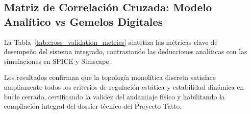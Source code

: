 \subsection{Matriz de Correlación Cruzada: Modelo Analítico vs Gemelos Digitales}

La Tabla~\ref{tab:cross_validation_metrics} sintetiza las métricas clave de desempeño del sistema integrado, contrastando las deducciones analíticas con las simulaciones en SPICE y Simscape.

\begin{table}[htbp]
\centering
\footnotesize
\setlength{\tabcolsep}{4pt}
\caption{Matriz de Correlación y Validación Cruzada entre Modelos Analíticos y Gemelos Numéricos.}
\label{tab:cross_validation_metrics}
\end{table}

Los resultados confirman que la topología monolítica discreta satisface ampliamente todos los criterios de regulación estática y estabilidad dinámica en bucle cerrado, certificando la validez del andamiaje físico y habilitando la compilación integral del dossier técnico del Proyecto Tatto.

